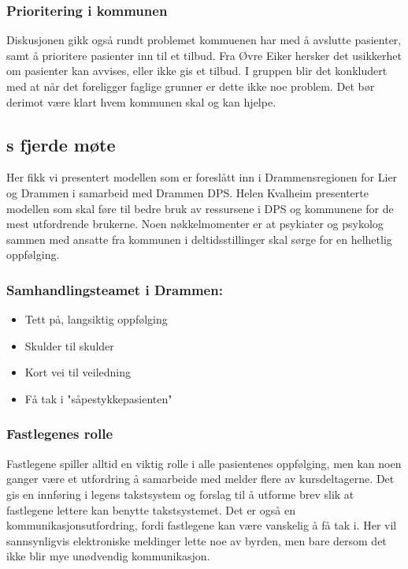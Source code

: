 \documentclass[11pt]{report} %
\begin{document}
                    \subsubsection{Prioritering i kommunen}
                    Diskusjonen gikk også rundt problemet kommuenen har med å avslutte pasienter, samt å prioritere pasienter inn til et tilbud. Fra Øvre Eiker hersker det usikkerhet om pasienter kan avvises, eller ikke gis et tilbud. I gruppen blir det konkludert med at når det foreligger faglige grunner er dette ikke noe problem. Det bør derimot være klart hvem kommunen skal og kan hjelpe.

                  \subsection{s fjerde møte}\label{sec:agr_4}
                    Her fikk vi presentert modellen som er foreslått inn i Drammensregionen for Lier og Drammen i samarbeid med Drammen DPS. Helen Kvalheim presenterte modellen som skal føre til bedre bruk av ressursene i DPS og kommunene for de mest utfordrende brukerne. Noen nøkkelmomenter er at psykiater og psykolog sammen med ansatte fra kommunen i deltidsstillinger skal sørge for en helhetlig oppfølging. 
                    \subsubsection{Samhandlingsteamet i Drammen:}
                     \begin{itemize}
                      \item Tett på, langsiktig oppfølging\\
                      \item Skulder til skulder\\
                      \item Kort vei til veiledning\\
                      \item Få tak i "såpestykkepasienten"\\
                     \end{itemize}
                    \subsubsection{Fastlegenes rolle}
                      Fastlegene spiller alltid en viktig rolle i alle pasientenes oppfølging, men kan noen ganger være et utfordring å samarbeide med melder flere av kursdeltagerne. Det gis en innføring i legens takstsystem og forslag til å utforme brev slik at fastlegene lettere kan benytte takstsystemet. Det er også en kommunikasjonsutfordring, fordi fastlegene kan være vanskelig å få tak i. Her vil sannsynligvis elektroniske meldinger lette noe av byrden, men bare dersom det ikke blir mye unødvendig kommunikasjon.
\end{document}
